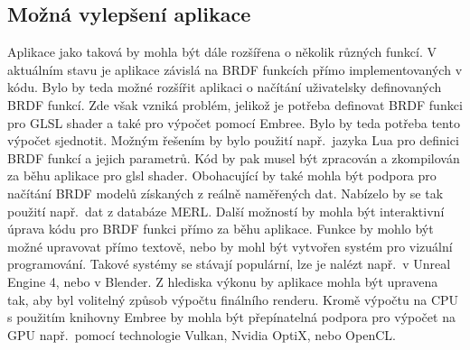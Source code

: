 \documentclass[czech,master]{diploma}
\begin{document}
\subsection*{Možná vylepšení aplikace}
Aplikace jako taková by mohla být dále rozšířena o několik různých funkcí. V aktuálním stavu je aplikace závislá na BRDF funkcích přímo implementovaných v kódu. Bylo by teda možné rozšířit aplikaci o načítání uživatelsky definovaných BRDF funkcí. Zde však vzniká problém, jelikož je potřeba definovat BRDF funkci pro GLSL shader a také pro výpočet pomocí Embree. Bylo by teda potřeba tento výpočet sjednotit. Možným řešením by bylo použití např.\ jazyka Lua pro definici BRDF funkcí a jejich parametrů. Kód by pak musel být zpracován a zkompilován za běhu aplikace pro glsl shader. Obohacující by také mohla být podpora pro načítání BRDF modelů získaných z reálně naměřených dat. Nabízelo by se tak použití např.\ dat z databáze MERL. Další možností by mohla být interaktivní úprava kódu pro BRDF funkci přímo za běhu aplikace. Funkce by mohlo být možné upravovat přímo textově, nebo by mohl být vytvořen systém pro vizuální programování. Takové systémy se stávají populární, lze je nalézt např.\ v Unreal Engine 4, nebo v Blender. Z hlediska výkonu by aplikace mohla být upravena tak, aby byl volitelný způsob výpočtu finálního renderu. Kromě výpočtu na CPU s použitím knihovny Embree by mohla být přepínatelná podpora pro výpočet na GPU např.\ pomocí technologie Vulkan, Nvidia OptiX, nebo OpenCL.

\printbibliography[title={Literatura}, heading=bibintoc]

\appendix
\end{document}
